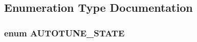 \subsection{Enumeration Type Documentation}
\hypertarget{group___autotuning_gac104fc2be1ec1bdac638e8bb7fa4ce7a}{
\subsubsection[{A\-U\-T\-O\-T\-U\-N\-E\-\_\-\-S\-T\-A\-T\-E}]{\setlength{\rightskip}{0pt plus 5cm}enum {\bf A\-U\-T\-O\-T\-U\-N\-E\-\_\-\-S\-T\-A\-T\-E}}}\label{group___autotuning_gac104fc2be1ec1bdac638e8bb7fa4ce7a}

